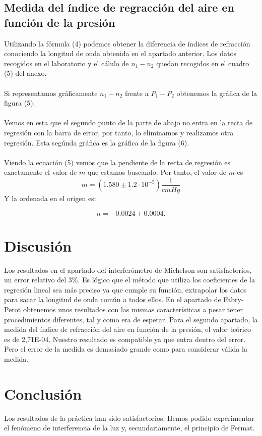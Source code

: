\documentclass[11pt,letterpaper,twocolumn]{article}
\begin{document}
\subsection{Medida del índice de regracción del aire en función de la presión}
Utilizando la fórmula (4) podemos obtener la diferencia de índices de refracción conociendo la longitud de onda obtenida en el apartado anterior. Los datos recogidos en el laboratorio y el cálulo de $  n_1-n_2$ quedan recogidos en el cuadro (5) del anexo. \\
\\
Si representamos gráficamente $ n_1-n_2 $ frente a $ P_1-P_2$ obtenemos la gráfica de la figura (5):\\
\\
Vemos en esta  que el segundo punto de la parte de abajo no entra en la recta de regresión con la barra de error, por tanto, lo eliminamos y realizamos otra regresión. Esta segúnda gráfica es la gráfica de la figura (6). \\
\\
Viendo la ecuación (5) vemos que la pendiente de la recta de regresión es exactamente el valor de $m$ que estamos buscando. Por tanto, el valor de $m$ es
\begin{equation}
    \boxed{m= \left( 1.580 \pm 1.2 \cdot 10^{-5} \right) \frac{1}{cmHg}}
\end{equation}
Y la ordenada en el origen es:

\[
n=-0.0024 \pm 0.0004
.\] 
\section{Discusión}%
Los resultados en el apartado del interferómetro de Michelson son satisfactorios, un error relativo del 3\%. Es lógico que el método que utiliza los coeficientes de la regresión lineal sea más preciso ya que cumple su función, extrapolar los datos para sacar la longitud de onda común a todos ellos. En el apartado de Fabry-Perot obtenemos unos resultados con las mismas características a pesar tener procedimientos diferentes, tal y como era de esperar.
Para el segundo apartado, la medida del índice de refracción del aire en función de la presión, el valor teórico es de 2,71E-04. Nuestro resultado es compatible ya que entra dentro del error. Pero el error de la medida es demasiado grande como para considerar válida la medida.
\section{Conclusión}%
Los resultados de la práctica han sido satisfactorios. Hemos podido experimentar el fenómeno de interferencia de la luz y, secundariamente, el principio de Fermat.
\end{document}
